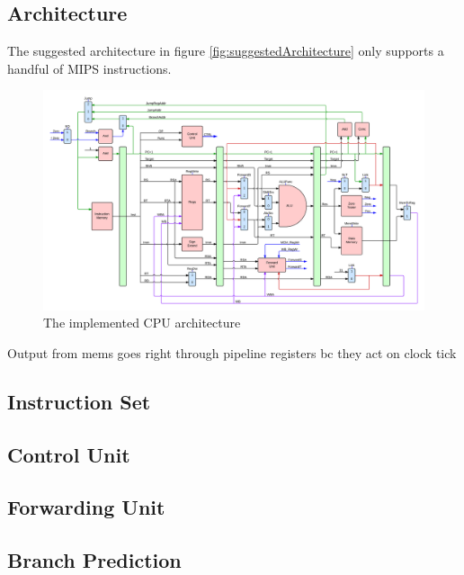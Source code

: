 \subsection{Architecture}

The suggested architecture in figure \ref{fig:suggestedArchitecture} only supports a handful of MIPS instructions. 

\begin{figure}[ht]
    \centering
    \includegraphics[width=\textwidth]{figures/Architecture.png}
    \caption{\label{fig:cpuArchitecture}The implemented CPU architecture} 
\end{figure}



Output from mems goes right through pipeline registers bc they act on clock tick

\subsection{Instruction Set}

\subsection{Control Unit}


\subsection{Forwarding Unit}

\subsection{Branch Prediction}

